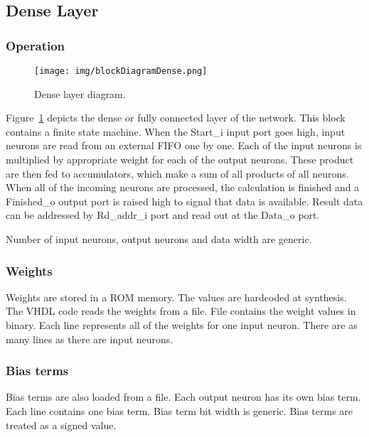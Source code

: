 \subsection{Dense Layer}

\subsubsection{Operation}
\begin{figure}[h]
	\centering
	\texttt{[image: img/blockDiagramDense.png]}
	\caption[Dense layer diagram]{Dense layer diagram.}
	\label{fig:denseLayerBlockDiagram}
\end{figure}

Figure~\ref{fig:denseLayerBlockDiagram} depicts the dense or fully connected layer of the network. This block contains a finite state machine. When the Start\_i input port goes high, input neurons are read from an external FIFO one by one. Each of the input neurons is multiplied by appropriate weight for each of the output neurons. These product are then fed to accumulators, which make a sum of all products of all neurons. When all of the incoming neurons are processed, the calculation is finished and a Finished\_o output port is raised high to signal that data is available. Result data can be addressed by Rd\_addr\_i port and read out at the Data\_o port.

Number of input neurons, output neurons and data width are generic.

\subsubsection{Weights}

Weights are stored in a ROM memory. The values are hardcoded at synthesis. The VHDL code reads the weights from a file. File contains the weight values in binary. Each line represents all of the weights for one input neuron. There are as many lines as there are input neurons.

\subsubsection{Bias terms}

Bias terms are also loaded from a file. Each output neuron has its own bias term. Each line contains one bias term. Bias term bit width is generic. Bias terms are treated as a signed value.
	

